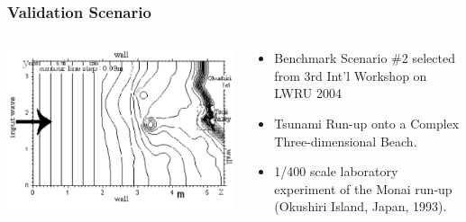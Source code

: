 \documentclass[11pt,ucs]{beamer}
\begin{document}
\begin{frame}\frametitle{Validation Scenario}

\begin{columns}
\begin{column}{0.6\textwidth}
\begin{center}
\includegraphics[width=\textwidth]{monai-contour.pdf}
\end{center}
\end{column}

\begin{column}{0.4\textwidth}
\begin{itemize}
\item Benchmark Scenario \#2 selected from 3rd Int'l Workshop on LWRU
2004

\vspace{0.25cm}
\item Tsunami Run-up onto a Complex Three-dimensional  Beach.

\vspace{0.25cm}
\item 1/400 scale laboratory experiment of the Monai run-up (Okushiri
Island, Japan, 1993).
\end{itemize}
\end{column}
\end{columns}

\end{frame}
\end{document}
